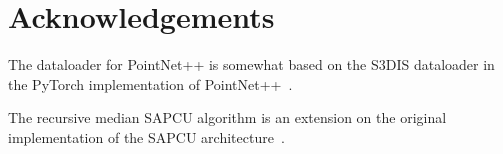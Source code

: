 \documentclass[10pt,twocolumn,letterpaper]{article}
\begin{document}
    \section{Acknowledgements}\label{sec:acknowledgements}

    The dataloader for PointNet++ is somewhat based on the S3DIS dataloader in the PyTorch implementation of PointNet++~\cite{qi2017pointnet, PytorchPointnetPointnet2}.

    The recursive median SAPCU algorithm is an extension on the original implementation of the SAPCU architecture~\cite{sapcu}.

    
    
\end{document}

